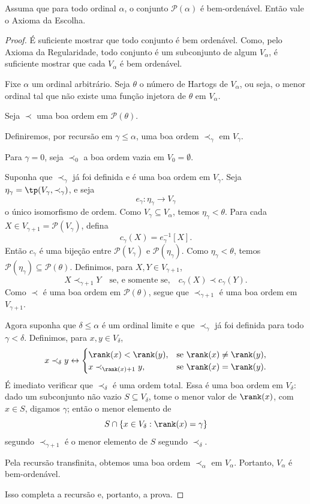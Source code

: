 \begin{theorem}[$\ZF$]
    Assuma que para todo ordinal $\alpha$, o conjunto $\mathcal P(\alpha)$ é bem-ordenável.
    Então vale o Axioma da Escolha.
\end{theorem}
\begin{proof}
    É suficiente mostrar que todo conjunto é bem ordenável.
    Como, pelo Axioma da Regularidade, todo conjunto é um subconjunto de algum $V_\alpha$, é suficiente mostrar que cada $V_\alpha$ é bem ordenável.

    Fixe $\alpha$ um ordinal arbitrário.
    Seja $\theta$ o número de Hartogs de $V_\alpha$, ou seja, o menor ordinal tal que não existe uma função injetora de $\theta$ em $V_\alpha$.

    Seja $\prec$ uma boa ordem em $\mathcal P(\theta)$.

    Definiremos, por recursão em $\gamma\leq\alpha$, uma boa ordem $\prec_\gamma$ em $V_\gamma$.

    Para $\gamma=0$, seja $\prec_0$ a boa ordem vazia em $V_0=\emptyset$.

    Suponha que $\prec_\gamma$ já foi definida e é uma boa ordem em $V_\gamma$.
    Seja $\eta_\gamma=\tp(V_\gamma,\prec_\gamma)$, e seja
    \[
        e_\gamma:\eta_\gamma\to V_\gamma
    \]
    o único isomorfismo de ordem.
    Como $V_\gamma\subseteq V_\alpha$, temos $\eta_\gamma<\theta$.
    Para cada $X\in V_{\gamma+1}=\mathcal P(V_\gamma)$, defina
    \[
        c_\gamma(X)=e_\gamma^{-1}[X].
    \]
    Então $c_\gamma$ é uma bijeção entre $\mathcal P(V_\gamma)$ e $\mathcal P(\eta_\gamma)$.
    Como $\eta_\gamma<\theta$, temos $\mathcal P(\eta_\gamma)\subseteq \mathcal P(\theta)$.
    Definimos, para $X,Y\in V_{\gamma+1}$,
    \[
        X\prec_{\gamma+1}Y
        \quad\text{se, e somente se,}\quad
        c_\gamma(X)\prec c_\gamma(Y).
    \]
    Como $\prec$ é uma boa ordem em $\mathcal P(\theta)$, segue que $\prec_{\gamma+1}$ é uma boa ordem em $V_{\gamma+1}$.

    Agora suponha que $\delta\leq\alpha$ é um ordinal limite e que $\prec_\gamma$ já foi definida para todo $\gamma<\delta$.
    Definimos, para $x,y\in V_\delta$,
    \[
        x\prec_\delta y\leftrightarrow\begin{cases}
            \rank(x)<\rank(y), & \text{se $\rank(x)\neq\rank(y)$},\\
            x\prec_{\rank(x)+1}y, & \text{se $\rank(x)=\rank(y)$}.
        \end{cases}
    \]
    É imediato verificar que $\prec_\delta$ é uma ordem total.
    Essa é uma boa ordem em $V_\delta$: dado um subconjunto não vazio $S\subseteq V_\delta$, tome o menor valor de $\rank(x)$, com $x\in S$, digamos $\gamma$; então o menor elemento de
    \[
        S\cap\{x\in V_\delta:\rank(x)=\gamma\}
    \]
    segundo $\prec_{\gamma+1}$ é o menor elemento de $S$ segundo $\prec_\delta$.

    Pela recursão transfinita, obtemos uma boa ordem $\prec_\alpha$ em $V_\alpha$.
    Portanto, $V_\alpha$ é bem-ordenável.

    Isso completa a recursão e, portanto, a prova.
\end{proof}
